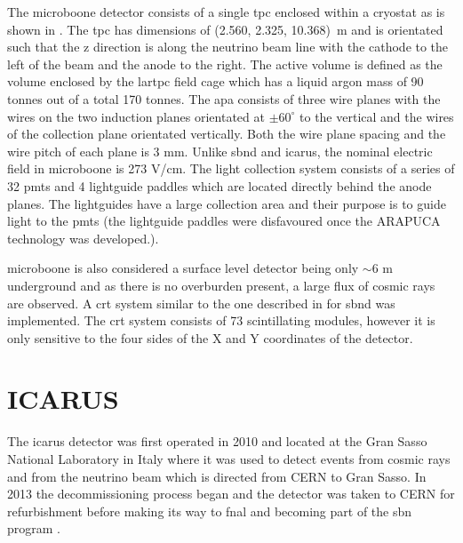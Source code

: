 The \gls{microboone} detector consists of a single \gls{tpc} enclosed within a cryostat as is shown in . The \gls{tpc} has dimensions of (2.560, 2.325, 10.368)~m and is orientated such that the z direction is along the neutrino beam line with the cathode to the left of the beam and the anode to the right. The active volume is defined as the volume enclosed by the \gls{lartpc} field cage which has a liquid argon mass of 90 tonnes out of a total 170 tonnes. The \gls{apa} consists of three wire planes with the wires on the two induction planes orientated at $\pm 60^{\circ}$ to the vertical and the wires of the collection plane orientated vertically. Both the wire plane spacing and the wire pitch of each plane is 3 mm. Unlike \gls{sbnd} and \gls{icarus}, the nominal electric field in \gls{microboone} is 273 V/cm. The light collection system consists of a series of 32 \glspl{pmt} and 4 lightguide paddles which are located directly behind the anode planes. The lightguides have a large collection area and their purpose is to guide light to the \glspl{pmt} (the lightguide paddles were disfavoured once the ARAPUCA technology was developed.)\cite{microboone_detector}.

\gls{microboone} is also considered a surface level detector being only $\sim 6$ m underground and as there is no overburden present, a large flux of cosmic rays are observed. A \gls{crt} system similar to the one described in  for \gls{sbnd} was implemented. The \gls{crt} system consists of 73 scintillating modules, however it is only sensitive to the four sides of the X and Y coordinates of the detector. 








\section{ICARUS}\label{sec:ICARUS}

The \gls{icarus} detector was first operated in 2010 and  located at the Gran Sasso National Laboratory in Italy where it was used to detect events from cosmic rays and from the neutrino beam which is directed from CERN to Gran Sasso. In 2013 the decommissioning process began and the detector was taken to CERN for refurbishment before making its way to \gls{fnal} and becoming part of the \gls{sbn} program \cite{SBN_Proposal}.

